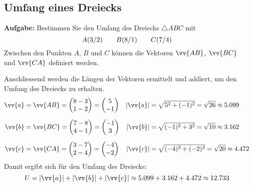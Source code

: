 \subsection{Umfang eines Dreiecks}
\textbf{Aufgabe:} Bestimmen Sie den Umfang des Dreiecks $\triangle ABC$ mit
\[
  \pxy[A]{3,2} \qquad \pxy[B]{8,1} \qquad \pxy[C]{7,4}
\]
Zwischen den Punkten $A$, $B$ und $C$ können die Vektoren $\vv{AB}$, $\vv{BC}$ und $\vv{CA}$ definiert werden.
\begin{center}
\end{center}
Anschliessend werden die Längen der Vektoren ermittelt und addiert, um den Umfang des Dreiecks zu erhalten.
\begin{align*}
  \vv{a} &= \vv{AB} = \vxy{8-3,1-2} = \vxy{5,-1} & |\vv{a}| &= \sqrt{5^{2}+(-1)^{2}} = \sqrt{26} \approx 5.099 \\[2mm]
  \vv{b} &= \vv{BC} = \vxy{7-8,4-1} = \vxy{-1,3} & |\vv{b}| &= \sqrt{(-1)^{2}+3^{2}} = \sqrt{10} \approx 3.162 \\[2mm]
  \vv{c} &= \vv{CA} = \vxy{3-7,2-4} = \vxy{-4,-2} & |\vv{c}| &= \sqrt{(-4)^{2}+(-2)^{2}} = \sqrt{20} \approx 4.472
\end{align*}
Damit ergibt sich für den Umfang des Dreiecks:
\[
  U = |\vv{a}|+|\vv{b}|+|\vv{c}| \approx 5.099 + 3.162 + 4.472 \approx 12.733
\]

\newpage
